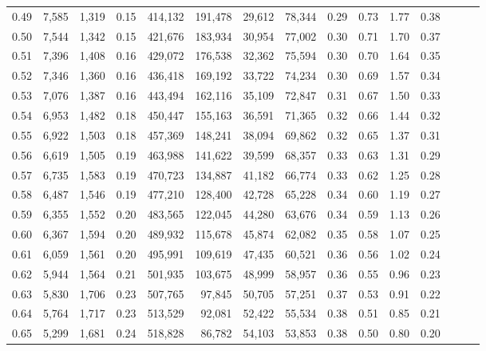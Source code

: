 \begin{tabular}{rrrrrrrrrrrrrrr}
0.49 &  7,585 &  1,319 &  0.15 &  414,132 &  191,478 &   29,612 &   78,344 &  0.29 &  0.73 &  1.77 &      0.38 \\
0.50 &  7,544 &  1,342 &  0.15 &  421,676 &  183,934 &   30,954 &   77,002 &  0.30 &  0.71 &  1.70 &      0.37 \\
0.51 &  7,396 &  1,408 &  0.16 &  429,072 &  176,538 &   32,362 &   75,594 &  0.30 &  0.70 &  1.64 &      0.35 \\
0.52 &  7,346 &  1,360 &  0.16 &  436,418 &  169,192 &   33,722 &   74,234 &  0.30 &  0.69 &  1.57 &      0.34 \\
0.53 &  7,076 &  1,387 &  0.16 &  443,494 &  162,116 &   35,109 &   72,847 &  0.31 &  0.67 &  1.50 &      0.33 \\
0.54 &  6,953 &  1,482 &  0.18 &  450,447 &  155,163 &   36,591 &   71,365 &  0.32 &  0.66 &  1.44 &      0.32 \\
0.55 &  6,922 &  1,503 &  0.18 &  457,369 &  148,241 &   38,094 &   69,862 &  0.32 &  0.65 &  1.37 &      0.31 \\
0.56 &  6,619 &  1,505 &  0.19 &  463,988 &  141,622 &   39,599 &   68,357 &  0.33 &  0.63 &  1.31 &      0.29 \\
0.57 &  6,735 &  1,583 &  0.19 &  470,723 &  134,887 &   41,182 &   66,774 &  0.33 &  0.62 &  1.25 &      0.28 \\
0.58 &  6,487 &  1,546 &  0.19 &  477,210 &  128,400 &   42,728 &   65,228 &  0.34 &  0.60 &  1.19 &      0.27 \\
0.59 &  6,355 &  1,552 &  0.20 &  483,565 &  122,045 &   44,280 &   63,676 &  0.34 &  0.59 &  1.13 &      0.26 \\
0.60 &  6,367 &  1,594 &  0.20 &  489,932 &  115,678 &   45,874 &   62,082 &  0.35 &  0.58 &  1.07 &      0.25 \\
0.61 &  6,059 &  1,561 &  0.20 &  495,991 &  109,619 &   47,435 &   60,521 &  0.36 &  0.56 &  1.02 &      0.24 \\
0.62 &  5,944 &  1,564 &  0.21 &  501,935 &  103,675 &   48,999 &   58,957 &  0.36 &  0.55 &  0.96 &      0.23 \\
0.63 &  5,830 &  1,706 &  0.23 &  507,765 &   97,845 &   50,705 &   57,251 &  0.37 &  0.53 &  0.91 &      0.22 \\
0.64 &  5,764 &  1,717 &  0.23 &  513,529 &   92,081 &   52,422 &   55,534 &  0.38 &  0.51 &  0.85 &      0.21 \\
0.65 &  5,299 &  1,681 &  0.24 &  518,828 &   86,782 &   54,103 &   53,853 &  0.38 &  0.50 &  0.80 &      0.20 \\

\end{tabular}
